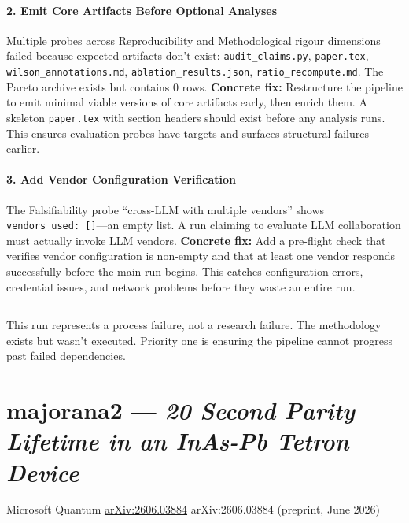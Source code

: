 \documentclass[10pt,letterpaper]{article}
\begin{document}
\hypertarget{emit-core-artifacts-before-optional-analyses}{%
\paragraph{2. Emit Core Artifacts Before Optional Analyses}\label{emit-core-artifacts-before-optional-analyses}}

Multiple probes across Reproducibility and Methodological rigour dimensions failed because expected artifacts don't exist: \texttt{audit\_claims.py}, \texttt{paper.tex}, \texttt{wilson\_annotations.md}, \texttt{ablation\_results.json}, \texttt{ratio\_recompute.md}. The Pareto archive exists but contains 0 rows. \textbf{Concrete fix:} Restructure the pipeline to emit minimal viable versions of core artifacts early, then enrich them. A skeleton \texttt{paper.tex} with section headers should exist before any analysis runs. This ensures evaluation probes have targets and surfaces structural failures earlier.

\hypertarget{add-vendor-configuration-verification}{%
\paragraph{3. Add Vendor Configuration Verification}\label{add-vendor-configuration-verification}}

The Falsifiability probe ``cross-LLM with multiple vendors'' shows \texttt{vendors\ used:\ {[}{]}}---an empty list. A run claiming to evaluate LLM collaboration must actually invoke LLM vendors. \textbf{Concrete fix:} Add a pre-flight check that verifies vendor configuration is non-empty and that at least one vendor responds successfully before the main run begins. This catches configuration errors, credential issues, and network problems before they waste an entire run.

\begin{center}\rule{0.5\linewidth}{0.5pt}\end{center}

This run represents a process failure, not a research failure. The methodology exists but wasn't executed. Priority one is ensuring the pipeline cannot progress past failed dependencies.


\clearpage
\section{majorana2 --- \emph{20 Second Parity Lifetime in an InAs-Pb Tetron Device}}
\noindent Microsoft Quantum \quad \href{https://arxiv.org/abs/2606.03884}{arXiv:2606.03884} \quad arXiv:2606.03884 (preprint, June 2026)
\end{document}
